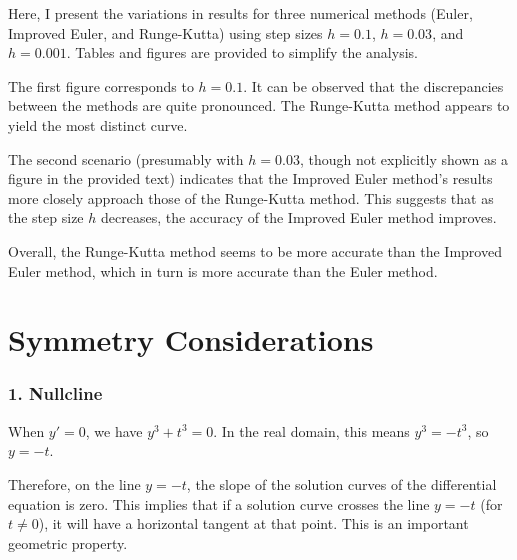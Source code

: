 \documentclass{article}
\begin{document}
Here, I present the variations in results for three numerical methods (Euler, Improved Euler, and Runge-Kutta) using step sizes \(h = 0.1\), \(h = 0.03\), and \(h = 0.001\). Tables and figures are provided to simplify the analysis.



The first figure corresponds to \(h = 0.1\). It can be observed that the discrepancies between the methods are quite pronounced. The Runge-Kutta method appears to yield the most distinct curve.



The second scenario (presumably with \(h = 0.03\), though not explicitly shown as a figure in the provided text) indicates that the Improved Euler method's results more closely approach those of the Runge-Kutta method. This suggests that as the step size \(h\) decreases, the accuracy of the Improved Euler method improves.



Overall, the Runge-Kutta method seems to be more accurate than the Improved Euler method, which in turn is more accurate than the Euler method.













\section{Symmetry Considerations}


\subsubsection*{1. Nullcline}

When $y' = 0$, we have $y^3 + t^3 = 0$. In the real domain, this means $y^3 = -t^3$, so $y = -t$.




Therefore, on the line $y = -t$, the slope of the solution curves of the differential equation is zero. This implies that if a solution curve crosses the line $y = -t$ (for $t \neq 0$), it will have a horizontal tangent at that point. This is an important geometric property.
\end{document}
